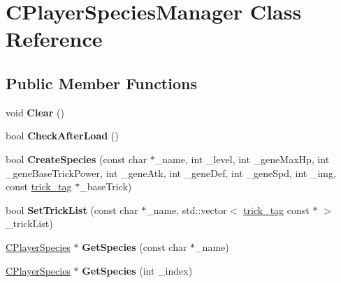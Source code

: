 \hypertarget{class_c_player_species_manager}{}\section{C\+Player\+Species\+Manager Class Reference}
\label{class_c_player_species_manager}
\subsection*{Public Member Functions}
\begin{DoxyCompactItemize}
\item 
void {\bfseries Clear} ()\hypertarget{class_c_player_species_manager_a2747a6543b5bd8529123fa166703b155}{}\label{class_c_player_species_manager_a2747a6543b5bd8529123fa166703b155}

\item 
bool {\bfseries Check\+After\+Load} ()\hypertarget{class_c_player_species_manager_a5832677e2570cc8dc99706a4fda1cb01}{}\label{class_c_player_species_manager_a5832677e2570cc8dc99706a4fda1cb01}

\item 
bool {\bfseries Create\+Species} (const char $\ast$\+\_\+name, int \+\_\+level, int \+\_\+gene\+Max\+Hp, int \+\_\+gene\+Base\+Trick\+Power, int \+\_\+gene\+Atk, int \+\_\+gene\+Def, int \+\_\+gene\+Spd, int \+\_\+img, const \hyperlink{structtrick__tag}{trick\+\_\+tag} $\ast$\+\_\+base\+Trick)\hypertarget{class_c_player_species_manager_a1447a4fa34a4f59e6c3c1dba92d70a1d}{}\label{class_c_player_species_manager_a1447a4fa34a4f59e6c3c1dba92d70a1d}

\item 
bool {\bfseries Set\+Trick\+List} (const char $\ast$\+\_\+name, std\+::vector$<$ \hyperlink{structtrick__tag}{trick\+\_\+tag} const $\ast$ $>$ \+\_\+trick\+List)\hypertarget{class_c_player_species_manager_ae69493f939538606bfa6195e14fb4769}{}\label{class_c_player_species_manager_ae69493f939538606bfa6195e14fb4769}

\item 
\hyperlink{class_c_player_species}{C\+Player\+Species} $\ast$ {\bfseries Get\+Species} (const char $\ast$\+\_\+name)\hypertarget{class_c_player_species_manager_a46a6df63e45579a5aae2f62a43c31b7a}{}\label{class_c_player_species_manager_a46a6df63e45579a5aae2f62a43c31b7a}

\item 
\hyperlink{class_c_player_species}{C\+Player\+Species} $\ast$ {\bfseries Get\+Species} (int \+\_\+index)\hypertarget{class_c_player_species_manager_a599e0f12ce94ef42a6be176f9abdfaaa}{}\label{class_c_player_species_manager_a599e0f12ce94ef42a6be176f9abdfaaa}


\end{DoxyCompactItemize}
